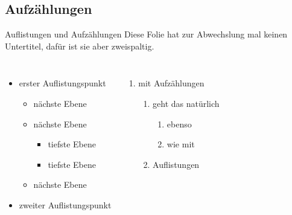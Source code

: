 \documentclass[utf8]{beamer}
\begin{document}
\subsection{Aufz\"ahlungen}
\begin{frame}{Auflistungen und Aufz\"ahlungen}
   Diese Folie hat zur Abwechslung mal keinen Untertitel, daf\"ur ist sie aber zweispaltig.

   \begin{columns}
         \begin{itemize}
            \item erster Auflistungspunkt
                  \begin{itemize}
                     \item n\"achste Ebene
                     \item n\"achste Ebene
                           \begin{itemize}
                              \item tiefste Ebene
                              \item tiefste Ebene
                           \end{itemize}
                     \item n\"achste Ebene
                  \end{itemize}
            \item zweiter Auflistungspunkt
         \end{itemize}

         \begin{enumerate}
            \item mit Aufz\"ahlungen
                  \begin{enumerate}
                     \item geht das nat\"urlich
                           \begin{enumerate}
                              \item ebenso
                              \item wie mit
                           \end{enumerate}
                     \item Auflistungen
                  \end{enumerate}
         \end{enumerate}
   \end{columns}

\end{frame}
\end{document}
